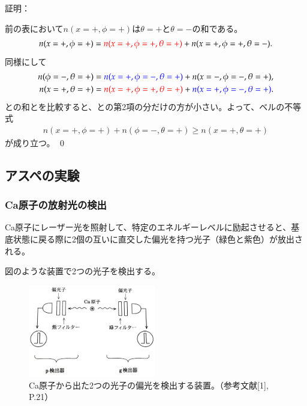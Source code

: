 \documentclass[10pt,b5paper,papersize,dvipdfmx]{jsbook}
\begin{document}
\noindent 証明：\par
前の表において$n(x=+,\phi=+)$は$\theta = +$と$\theta = -$の和である。
\begin{align}
  \label{eq:bell-1}
  n(x=+,\phi=+) = \textcolor{red}{n(x=+,\phi=+, \theta=+)} + n(x=+,\phi=+, \theta=-).
\end{align}
同様にして
\begin{align}
  \label{eq:bell-2}
  n(\phi=-,\theta=+) &= \textcolor{blue}{n(x=+, \phi=-,\theta=+)} + n(x=-, \phi=-,\theta=+)
  , \\
  \label{eq:bell-3}
  n(x=+,\theta=+) &= \textcolor{red}{n(x=+, \phi=+, \theta=+)} + \textcolor{blue}{n(x=+, \phi=-, \theta=+)}.
\end{align}
との和とを比較すると、との第2項の分だけの方が小さい。よって、ベルの不等式
\begin{align*}
  n(x=+,\phi=+) + n(\phi=-,\theta=+) \ge n(x=+,\theta=+)
\end{align*}
が成り立つ。
\qed

%
\subsection{アスペの実験} %

%
\subsubsection{Ca原子の放射光の検出} %

Ca原子にレーザー光を照射して、特定のエネルギーレベルに励起させると、基底状態に戻る際に2個の互いに直交した偏光を持つ光子（緑色と紫色）が放出される。

図のような装置で2つの光子を検出する。

\begin{figure}[ht]
  \centering
  \includegraphics[height=40mm]{nkym/fig/souchi.jpeg}
  \caption{Ca原子から出た2つの光子の偏光を検出する装置。（参考文献[1], P.21）}
\end{figure}
\end{document}
